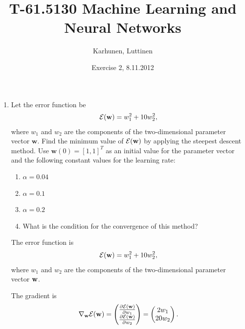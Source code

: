 
\title{T-61.5130 Machine Learning and Neural Networks}
\author{Karhunen, Luttinen}
\date{Exercise 2, 8.11.2012}


\newcommand{\vect}[1]{{\bf{#1}}}
\newcommand{\svect}[1]{\boldsymbol{#1}}
\newcommand{\matr}[1]{\boldsymbol{#1}}
\newcommand{\vw}{{\bf{w}}}
\newcommand{\ve}{{\bf{e}}}
\newcommand{\vx}{{\bf{x}}}



\maketitle

\begin{enumerate}

\item Let the error function be
  \begin{equation*}
    {\cal E}(\mathbf{w})=w_1^2+10w_2^2,
  \end{equation*}
  where $w_1$ and $w_2$ are the components of the two-dimensional
  parameter vector $\mathbf{w}$. Find the minimum value of ${\cal
    E}(\mathbf{w})$ by applying the steepest descent method. Use
  $\mathbf{w}(0)=[1,1]^T$ as an initial value for the parameter vector
  and the following constant values for the learning rate:
  \begin{enumerate} \item $\alpha=0.04$ \item $\alpha=0.1$ \item
    $\alpha=0.2$
  \item What is the condition for the convergence of this method?
  \end{enumerate}

  \begin{solution}

    The error function is
    \begin{equation*}
      {\cal E}(\vw)=w_1^2+10w_2^2,
    \end{equation*}
    where $w_1$ and $w_2$ are the components of the two-dimensional
    parameter vector $\vw$. 

    The gradient is
    \begin{equation*}
      \nabla_{\vw} {\cal E} (\vw) = \begin{pmatrix} \frac{\partial {\cal E}
          (\vw)}{\partial w_1} \\  \frac{\partial  {\cal E} (\vw) }{\partial
          w_2}\end{pmatrix} = \begin{pmatrix} 2 w_1 \\  20 w_2 \end{pmatrix}.
    \end{equation*}


\end{solution}
\end{enumerate}
